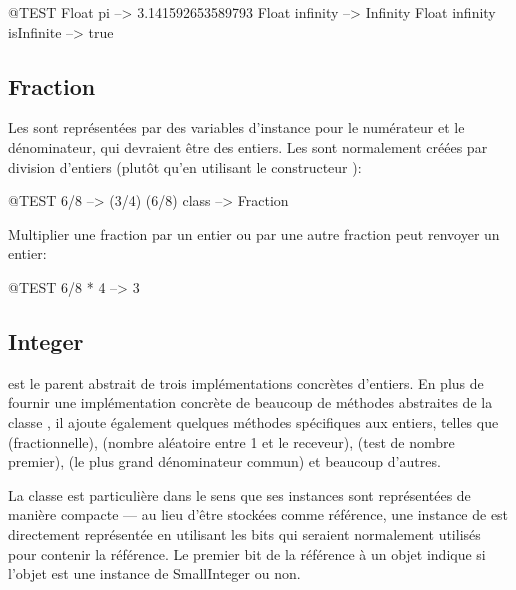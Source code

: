 \documentclass[a4paper,10pt,twoside]{book}
\begin{document}
\begin{code}{@TEST}
Float pi                      --> 3.141592653589793
Float infinity               --> Infinity
Float infinity isInfinite --> true
\end{code}

\subsection{Fraction}

Les  sont représentées par des variables d'instance pour le numérateur et le dénominateur, qui devraient être des entiers. Les  sont normalement créées par division d'entiers (plutôt qu'en utilisant le constructeur ):

\begin{code}{@TEST}
6/8             --> (3/4)
(6/8) class --> Fraction
\end{code}

Multiplier une fraction par un entier ou par une autre fraction peut renvoyer un entier:

\begin{code}{@TEST}
6/8 * 4 --> 3
\end{code}


\subsection{Integer}

 est le parent abstrait de trois implémentations
concrètes d'entiers. En plus de fournir une implémentation
concrète de beaucoup de méthodes abstraites de la classe
, il ajoute également quelques méthodes spécifiques
aux entiers, telles que 
(fractionnelle),
(nombre aléatoire entre 1 et le receveur),
(test de nombre premier), 
(le plus grand dénominateur commun)
et beaucoup d'autres.

La classe  est particulière dans le sens que ses instances sont représentées de manière compacte --- au lieu d'être stockées comme référence, une instance de  est directement représentée en utilisant les bits qui seraient normalement utilisés pour contenir la référence.  Le premier bit de la référence à un objet indique si l'objet est une instance de SmallInteger ou non.
\end{document}
